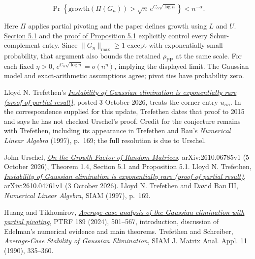 \documentclass[11pt,a4paper]{article}
\makeatletter
\renewcommand{\subsection}{\Needspace{4\baselineskip}\@startsection{subsection}{2}{0pt}{9pt plus 1pt minus 1pt}{3pt}{\sffamily\bfseries\normalsize\color{ink}}}
\makeatother
\begin{document}
\[\Pr\!\left\{\mathrm{growth}(\Pi(G_n))>
\sqrt n\,e^{C_\alpha\sqrt{\log n}}\right\}< n^{-\alpha}.\]

Here \(\Pi\) applies partial pivoting and the paper defines
\(\mathrm{growth}\) using \(L\) and \(U\).
\href{https://arxiv.org/html/2610.06785v1\#S5.SS1}{Section 5.1} and the
\href{https://arxiv.org/html/2610.06785v1\#S5.SS2}{proof of Proposition
5.1} explicitly control every Schur-complement entry. Since
\(\|G_n\|_{\max}\ge1\) except with exponentially small probability, that
argument also bounds the retained \(\rho_{\mathrm{PP}}\) at the same
scale. For each fixed \(\eta>0\),
\(e^{C_\alpha\sqrt{\log n}}=o(n^\eta)\), implying the displayed limit.
The Gaussian model and exact-arithmetic assumptions agree; pivot ties
have probability zero.

Lloyd N. Trefethen's
\href{https://arxiv.org/abs/2610.04761v1}{\emph{Instability of Gaussian
elimination is exponentially rare (proof of partial result)}}, posted 3
October 2026, treats the corner entry \(u_{nn}\). In the correspondence
supplied for this update, Trefethen dates that proof to 2015 and says he
has not checked Urschel's proof. Credit for the conjecture remains with
Trefethen, including its appearance in Trefethen and Bau's
\emph{Numerical Linear Algebra} (1997), p.~169; the full resolution is
due to Urschel.

\subsection{References}\label{references}

John Urschel, \href{https://arxiv.org/abs/2610.06785v1}{\emph{On the
Growth Factor of Random Matrices}}, arXiv:2610.06785v1 (5 October 2026),
Theorem 1.4, Section 5.1 and Proposition 5.1. Lloyd N. Trefethen,
\href{https://arxiv.org/abs/2610.04761v1}{\emph{Instability of Gaussian
elimination is exponentially rare (proof of partial result)}},
arXiv:2610.04761v1 (3 October 2026). Lloyd N. Trefethen and David Bau
III, \emph{Numerical Linear Algebra}, SIAM (1997), p.~169.

Huang and Tikhomirov,
\href{https://doi.org/10.1007/s00440-024-01276-2}{\emph{Average-case
analysis of the Gaussian elimination with partial pivoting}}, PTRF 189
(2024), 501--567, introduction, discussion of Edelman's numerical
evidence and main theorems. Trefethen and Schreiber,
\href{https://doi.org/10.1137/0611023}{\emph{Average-Case Stability of
Gaussian Elimination}}, SIAM J. Matrix Anal. Appl. 11 (1990), 335--360.
\end{document}
